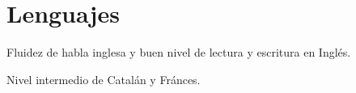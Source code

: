 \documentclass[a4paper]{article}
\def\footerlink{}
\renewenvironment{itemize}{
  \begin{list}{}{
    \setlength{\leftmargin}{1.5em}
  }
}{
  \end{list}
}
\begin{document}
\section*{Lenguajes}

\begin{itemize}
  \item Fluidez de habla inglesa y buen nivel de lectura y escritura en Inglés.
  \item Nivel intermedio de Catalán y Fránces.
\end{itemize}

\bigskip

\end{document}
